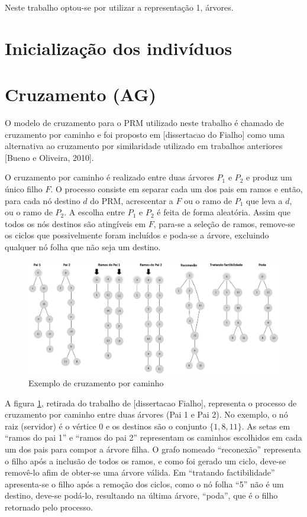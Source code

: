 Neste trabalho optou-se por utilizar a representação 1, árvores.

\section{Inicialização dos indivíduos}

\section{Cruzamento (AG)}

O modelo de cruzamento para o PRM utilizado neste trabalho é chamado de cruzamento por caminho e foi proposto em [dissertacao do Fialho] como uma alternativa ao cruzamento por similaridade utilizado em trabalhos anteriores [Bueno e Oliveira, 2010].

O cruzamento por caminho é realizado entre duas árvores $P_1$ e $P_2$ e produz um único filho $F$. O processo consiste em separar cada um dos pais em ramos e então, para cada nó destino $d$ do PRM, acrescentar a $F$ ou o ramo de $P_1$ que leva a $d$, ou o ramo de $P_2$. A escolha entre $P_1$ e $P_2$ é feita de forma aleatória. Assim que todos os nós destinos são atingíveis em $F$, para-se a seleção de ramos, remove-se os ciclos que possivelmente foram incluídos e poda-se a árvore, excluindo qualquer nó folha que não seja um destino.

\begin{figure}[!htbp]
	\label{fig_prm-cruzamento-caminho}
	\caption{Exemplo de cruzamento por caminho}
	\centering
	\includegraphics[width=1\textwidth]{cap_estrategias-prm/figs/prm-cruzamento-caminho}
\end{figure}

A figura \ref{fig_prm-cruzamento-caminho}, retirada do trabalho de [dissertacao Fialho], representa o processo de cruzamento por caminho entre duas árvores (Pai 1 e Pai 2). No exemplo, o nó raiz (servidor) é o vértice 0 e os destinos são o conjunto $\{1, 8, 11\}$. As setas em ``ramos do pai 1'' e ``ramos do pai 2'' representam os caminhos escolhidos em cada um dos pais para compor a árvore filha. O grafo nomeado ``reconexão'' representa o filho após a inclusão de todos os ramos, e como foi gerado um ciclo, deve-se removê-lo afim de obter-se uma árvore válida. Em ``tratando factibilidade'' apresenta-se o filho após a remoção dos ciclos, como o nó folha ``5'' não é um destino, deve-se podá-lo, resultando na última árvore, ``poda'', que é o filho retornado pelo processo.

